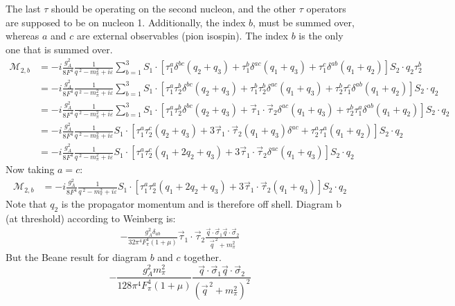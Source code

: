 \documentclass[11pt]{article}
\newcommand\ddfrac[2]{\frac{\displaystyle #1}{\displaystyle #2}}
\newcommand\mm{\mathcal{M}}
\begin{document}
The last $\tau$ should be operating on the second nucleon, and the other $\tau$ operators are supposed to be on nucleon 1. Additionally, the index $b$, must be summed over, whereas $a$ and $c$ are external observables (pion isospin). The index $b$ is the only one that is summed over.
\begin{align}
\mm_{2,b}&=-i\frac{g_A^2}{8F^4}\frac{1}{q^{\;2}- m_\pi^2 + i \varepsilon} \sum_{b=1}^3 S_1 \cdot \left[ \tau_1^a \delta^{bc} (q_2+q_3) + \tau_1^b \delta^{ac} (q_1+q_3)+ \tau_1^c \delta^{ab} \left(q_1+q_2\right)\right] S_2 \cdot q_2 \tau^b_2\\
               &=-i\frac{g_A^2}{8F^4}\frac{1}{q^{\;2}- m_\pi^2 + i \varepsilon} \sum_{b=1}^3 S_1 \cdot \left[ \tau_1^a\tau_2^b \delta^{bc} (q_2+q_3) + \tau_1^b \tau_2^b\delta^{ac} (q_1+q_3)+ \tau_2^b\tau_1^c \delta^{ab} \left(q_1+q_2\right)\right] S_2 \cdot q_2\label{Correct}\\
               &=-i\frac{g_A^2}{8F^4}\frac{1}{q^{\;2}- m_\pi^2 + i \varepsilon} \sum_{b=1}^3 S_1 \cdot \left[ \tau_1^a\tau_2^b \delta^{bc} (q_2+q_3) + \vec{\tau}_1 \cdot \vec{\tau}_2 \delta^{ac}(q_1+q_3)+ \tau_2^b\tau_1^a \delta^{ab} \left(q_1+q_2\right)\right] S_2 \cdot q_2\\
    &=-i\frac{g_A^2}{8F^4}\frac{1}{q^{\;2}- m_\pi^2 + i \varepsilon} S_1 \cdot \left[ \tau_1^a\tau_2^c (q_2+q_3) +3\vec{\tau}_1 \cdot \vec{\tau}_2 (q_1+q_3)\delta^{ac}+ \tau_2^a\tau_1^a \left(q_1+q_2\right)\right] S_2 \cdot q_2\\
    &=-i\frac{g_A^2}{8F^4}\frac{1}{q^{\;2}- m_\pi^2 + i \varepsilon} S_1 \cdot \left[ \tau_1^a\tau_2^c (q_1+2q_2+q_3) +3\vec{\tau}_1 \cdot \vec{\tau}_2 \delta^{ac}(q_1+q_3)\right] S_2 \cdot q_2
\end{align}
Now taking $a=c$:
\begin{align}
 \mm_{2,b}&=-i\frac{g_A^2}{8F^4}\frac{1}{q^{\;2}- m_\pi^2 + i \varepsilon} S_1 \cdot \left[ \tau_1^a\tau_2^a (q_1+2q_2+q_3) +3\vec{\tau}_1 \cdot \vec{\tau}_2 (q_1+q_3)\right] S_2 \cdot q_2
\end{align}
Note that $q_2$ is the propagator momentum and is therefore off shell.
Diagram b (at threshold) according to Weinberg is:
\begin{align}
    - \frac{g_A^2 \delta_{ab}}{32 \pi^4 F_\pi^4 (1+\mu)} \vec{\tau}_1 \cdot \vec{\tau}_2
    \ddfrac{\vec{q}\cdot \vec{\sigma}_1 \vec{q} \cdot \vec{\sigma}_2}{\vec{q}^{\,2} + m_\pi^2} 
\end{align}
But the Beane result for diagram $b$ and $c$ together.
\begin{equation}
    - \frac{g_A^2 m_\pi^2}{128 \pi^4 F_\pi^4 (1+\mu)} 
    \ddfrac{\vec{q}\cdot \vec{\sigma}_1 \vec{q} \cdot \vec{\sigma}_2}{(\vec{q}^{\,2} + m_\pi^2)^2} 
\end{equation}
\end{document}
